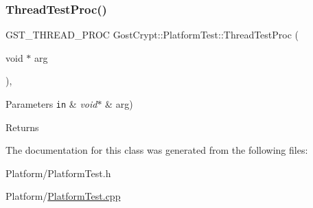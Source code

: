\subsubsection{\texorpdfstring{Thread\+Test\+Proc()}{ThreadTestProc()}}
{\footnotesize\ttfamily G\+S\+T\+\_\+\+T\+H\+R\+E\+A\+D\+\_\+\+P\+R\+OC Gost\+Crypt\+::\+Platform\+Test\+::\+Thread\+Test\+Proc (\begin{DoxyParamCaption}\item[{void $\ast$}]{arg }\end{DoxyParamCaption})\hspace{0.3cm}{\ttfamily [static]}, {\ttfamily [protected]}}


\begin{DoxyParams}[1]{Parameters}
\mbox{\tt in}  & {\em void$\ast$} & arg) \\
\hline
\end{DoxyParams}
\begin{DoxyReturn}{Returns}

\end{DoxyReturn}


The documentation for this class was generated from the following files\+:\begin{DoxyCompactItemize}
\item 
Platform/Platform\+Test.\+h\item 
Platform/\hyperlink{_platform_test_8cpp}{Platform\+Test.\+cpp}\end{DoxyCompactItemize}
